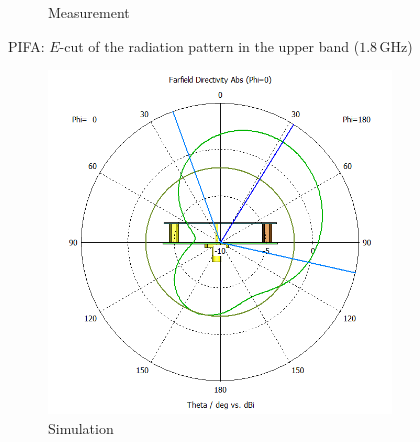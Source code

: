 \documentclass[11pt,a4paper]{article}
\begin{document}
\begin{figure}[!ht]
\begin{subfigure}{.4\textwidth}
                \caption{\label{fig:pifa-meas-radiation-e-1G8Hz}Measurement}
            \end{subfigure}
            \caption{\label{fig:pifa-radiation-e-1G8Hz}PIFA: $E$-cut of the radiation pattern in the upper band ($1.8\, \mathrm{GHz}$)}
        \end{figure}

\newpage
        \begin{figure}[!ht]
            \centering
            \begin{subfigure}{.4\textwidth}
                \centering
                \includegraphics[width=\textwidth]{src/pifa-sim-radiation-h-1G8Hz.png}
                \caption{\label{fig:pifa-sim-radiation-h-1G8Hz}Simulation}
            \end{subfigure}
            ~
            \begin{subfigure}{.4\textwidth}
                \centering

\end{subfigure}
\end{figure}
\end{document}
